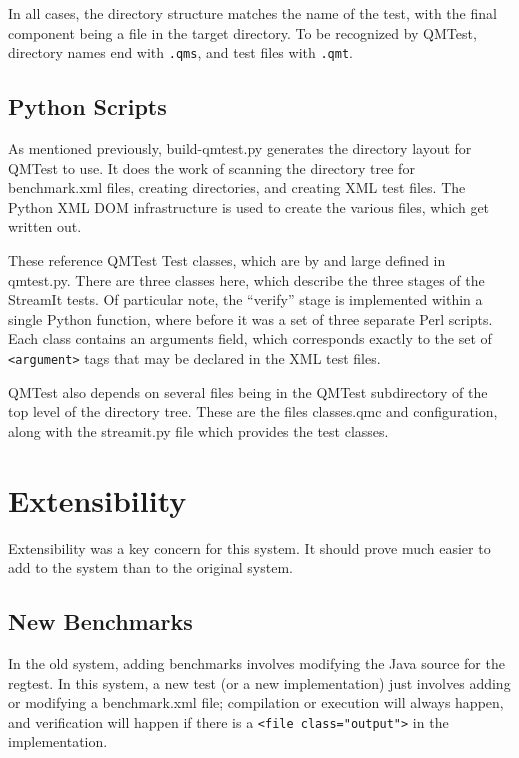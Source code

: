 \documentclass[11pt]{article}
\begin{document}
In all cases, the directory structure matches the name of the test,
with the final component being a file in the target directory.  To be
recognized by QMTest, directory names end with \texttt{.qms}, and test
files with \texttt{.qmt}.

\subsection{Python Scripts}

As mentioned previously, \textsf{build-qmtest.py} generates the
directory layout for QMTest to use.  It does the work of scanning the
directory tree for \textsf{benchmark.xml} files, creating directories,
and creating XML test files.  The Python XML DOM infrastructure is
used to create the various files, which get written out.

These reference QMTest Test classes, which are by and large defined in
\textsf{qmtest.py}.  There are three classes here, which describe the
three stages of the StreamIt tests.  Of particular note, the
``verify'' stage is implemented within a single Python function, where
before it was a set of three separate Perl scripts.  Each class
contains an \textsf{arguments} field, which corresponds exactly to the
set of \verb|<argument>| tags that may be declared in the XML test
files.

QMTest also depends on several files being in the \textsf{QMTest}
subdirectory of the top level of the directory tree.  These are the
files \textsf{classes.qmc} and \textsf{configuration}, along with the
\textsf{streamit.py} file which provides the test classes.

\section{Extensibility}

Extensibility was a key concern for this system.  It should prove much
easier to add to the system than to the original system.

\subsection{New Benchmarks}

In the old system, adding benchmarks involves modifying the Java
source for the regtest.  In this system, a new test (or a new
implementation) just involves adding or modifying a
\textsf{benchmark.xml} file; compilation or execution will always
happen, and verification will happen if there is a
\verb|<file class="output">| in the implementation.
\end{document}
